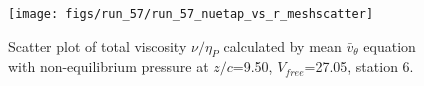 \begin{figure}[H]
\centering
\texttt{[image: figs/run\_57/run\_57\_nuetap\_vs\_r\_meshscatter]}
\caption{Scatter plot of total viscosity $\nu / \eta_P$ calculated by mean $\bar{v}_{\theta}$ equation with non-equilibrium pressure at $z/c$=9.50, $V_{free}$=27.05, station 6.}
\label{fig:run_57_nuetap_vs_r_meshscatter}
\end{figure}


